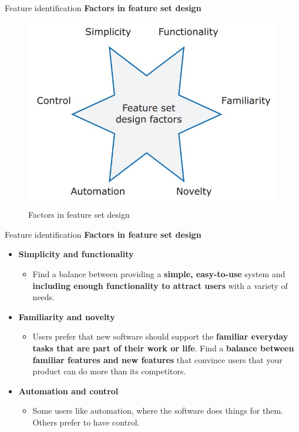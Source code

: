 \documentclass{beamer}
\begin{document}
\begin{frame}{Feature identification}
	\textbf{Factors in feature set design}
	\begin{figure}
		\includegraphics[scale=.45]{img/m2_30.jpg}
		\caption{Factors in feature set design}
	\end{figure}
\end{frame}
\begin{frame}{Feature identification}
	\textbf{Factors in feature set design}
	\begin{itemize}
		\item \textbf{Simplicity and functionality }
		\begin{itemize}
			\item Find a balance between providing a \textbf{simple, easy-to-use} system and \textbf{including enough functionality to attract users} with a variety of needs.
		\end{itemize}
		\item \textbf{Familiarity and novelty}
		\begin{itemize}
			\item Users prefer that new software should support the \textbf{familiar everyday tasks that are part of their work or life}. Find a \textbf{balance between familiar features and new features} that convince users that your product can do more than its competitors. 
		\end{itemize}
		\item \textbf{Automation and control}
		\begin{itemize}
			\item Some users like automation, where the software does things for them. Others prefer to have control. 
		\end{itemize}
	\end{itemize}
\end{frame}
\end{document}
